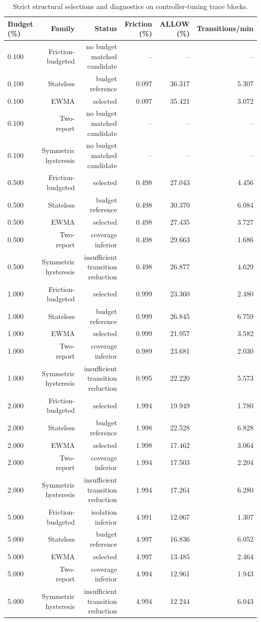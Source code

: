 \begin{table}[t]
\centering
\scriptsize
\caption{Strict structural selections and diagnostics on controller-tuning trace blocks.}
\label{tab:tuning-frontier}
\begin{tabular}{lrrrrr}
\hline
Budget (\%) & Family & Status & Friction (\%) & ALLOW (\%) & Transitions/min \\
\hline
0.100 & Friction-budgeted & no budget matched candidate & -- & -- & -- \\
0.100 & Stateless & budget reference & 0.097 & 36.317 & 5.307 \\
0.100 & EWMA & selected & 0.097 & 35.421 & 3.072 \\
0.100 & Two-report & no budget matched candidate & -- & -- & -- \\
0.100 & Symmetric hysteresis & no budget matched candidate & -- & -- & -- \\
0.500 & Friction-budgeted & selected & 0.498 & 27.043 & 4.456 \\
0.500 & Stateless & budget reference & 0.498 & 30.370 & 6.084 \\
0.500 & EWMA & selected & 0.498 & 27.435 & 3.727 \\
0.500 & Two-report & coverage inferior & 0.498 & 29.663 & 1.686 \\
0.500 & Symmetric hysteresis & insufficient transition reduction & 0.498 & 26.877 & 4.629 \\
1.000 & Friction-budgeted & selected & 0.999 & 23.360 & 2.480 \\
1.000 & Stateless & budget reference & 0.999 & 26.845 & 6.759 \\
1.000 & EWMA & selected & 0.999 & 21.957 & 3.582 \\
1.000 & Two-report & coverage inferior & 0.989 & 23.681 & 2.030 \\
1.000 & Symmetric hysteresis & insufficient transition reduction & 0.995 & 22.220 & 5.573 \\
2.000 & Friction-budgeted & selected & 1.994 & 19.949 & 1.780 \\
2.000 & Stateless & budget reference & 1.998 & 22.528 & 6.828 \\
2.000 & EWMA & selected & 1.998 & 17.462 & 3.064 \\
2.000 & Two-report & coverage inferior & 1.994 & 17.503 & 2.204 \\
2.000 & Symmetric hysteresis & insufficient transition reduction & 1.994 & 17.264 & 6.280 \\
5.000 & Friction-budgeted & isolation inferior & 4.991 & 12.067 & 1.307 \\
5.000 & Stateless & budget reference & 4.997 & 16.836 & 6.052 \\
5.000 & EWMA & selected & 4.997 & 13.485 & 2.464 \\
5.000 & Two-report & coverage inferior & 4.994 & 12.961 & 1.943 \\
5.000 & Symmetric hysteresis & insufficient transition reduction & 4.994 & 12.244 & 6.043 \\
\hline
\end{tabular}
\end{table}
